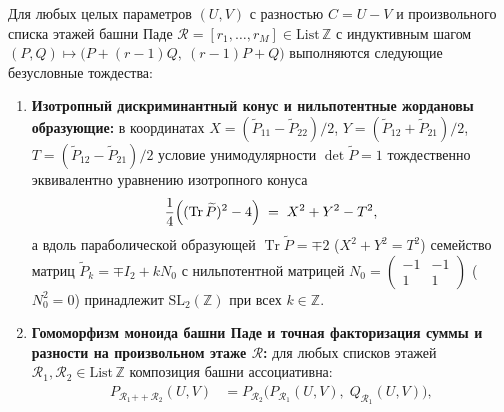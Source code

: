 \begin{theorem}
\label{thm:math-pade-tower-cubic-compression}
\leanok
Для любых целых параметров $(U, V)$ с разностью $C = U - V$ и произвольного списка этажей башни Паде $\mathcal{R} = [r_1, \dots, r_M] \in \mathrm{List}\,\mathbb{Z}$ с индуктивным шагом $(P, Q) \mapsto \bigl(P + (r - 1)Q,\ (r - 1)P + Q\bigr)$ выполняются следующие безусловные тождества:
\begin{enumerate}[label=\textbf{(\arabic*)},leftmargin=*]
\item \textbf{Изотропный дискриминантный конус и нильпотентные жордановы образующие:}
  в координатах $X = (\widetilde{P}_{11} - \widetilde{P}_{22})/2$, $Y = (\widetilde{P}_{12} + \widetilde{P}_{21})/2$, $T = (\widetilde{P}_{12} - \widetilde{P}_{21})/2$ условие унимодулярности $\det\widetilde{P} = 1$ тождественно эквивалентно уравнению изотропного конуса
  \begin{equation}
    \label{eq:math-sl2-isotropic-cone}
    \frac{1}{4}\Bigl((\operatorname{Tr}\widetilde{P})^2 - 4\Bigr) \;=\; X^2 + Y^2 - T^2,
  \end{equation}
  а вдоль параболической образующей $\operatorname{Tr}\widetilde{P} = \mp 2$ ($X^2 + Y^2 = T^2$) семейство матриц $\widetilde{P}_k = \mp I_2 + k N_0$ с нильпотентной матрицей $N_0 = \begin{pmatrix} -1 & -1 \\ 1 & 1 \end{pmatrix}$ ($N_0^2 = 0$) принадлежит $\mathrm{SL}_2(\mathbb{Z})$ при всех $k \in \mathbb{Z}$.
\item \textbf{Гомоморфизм моноида башни Паде и точная факторизация суммы и разности на произвольном этаже $\mathcal{R}$:}
  для любых списков этажей $\mathcal{R}_1, \mathcal{R}_2 \in \mathrm{List}\,\mathbb{Z}$ композиция башни ассоциативна:
  \begin{align}
    P_{\mathcal{R}_1\mathbin{+\!+}\mathcal{R}_2}(U, V) &= P_{\mathcal{R}_2}\bigl(P_{\mathcal{R}_1}(U, V),\; Q_{\mathcal{R}_1}(U, V)\bigr), \label{eq:math-pade-monoid-p} \\

\end{align}
\end{enumerate}
\end{theorem}

